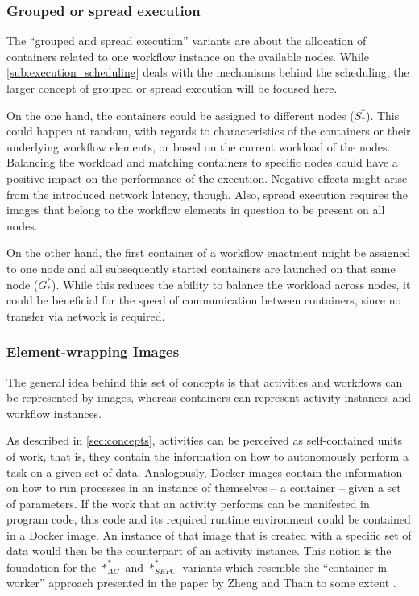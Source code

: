   \subsubsection{Grouped or spread execution} %
  \label{ssub:grouped_or_spread_execution}
    The ``grouped and spread execution'' variants are about the allocation of containers related to one workflow instance on the available nodes. While \ref{sub:execution_scheduling} deals with the mechanisms behind the scheduling, the larger concept of grouped or spread execution will be focused here.

    On the one hand, the containers could be assigned to different nodes ($S_*^*$). This could happen at random, with regards to characteristics of the containers or their underlying workflow elements, or based on the current workload of the nodes. Balancing the workload and matching containers to specific nodes could have a positive impact on the performance of the execution. Negative effects might arise from the introduced network latency, though. Also, spread execution requires the images that belong to the workflow elements in question to be present on all nodes.

    On the other hand, the first container of a workflow enactment might be assigned to one node and all subsequently started containers are launched on that same node ($G_*^*$). While this reduces the ability to balance the workload across nodes, it could be beneficial for the speed of communication between containers, since no transfer via network is required.

  \subsubsection{Element-wrapping Images} %
  \label{ssub:element_wrapping_containers}
    The general idea behind this set of concepts is that activities and workflows can be represented by images, whereas containers can represent activity instances and workflow instances.

    As described in \ref{sec:concepts}, activities can be perceived as self-contained units of work, that is, they contain the information on how to autonomously perform a task on a given set of data.
    Analogously, Docker images contain the information on how to run processes in an instance of themselves -- a container -- given a set of parameters. If the work that an activity performs can be manifested in  program code, this code and its required runtime environment could be contained in a Docker image. An instance of that image that is created with a specific set of data would then be the counterpart of an activity instance. This notion is the foundation for the $*_{AC}^{*}$ and $*_{SEPC}^{*}$ variants which resemble the ``container-in-worker'' approach presented in the paper by Zheng and Thain to some extent \cite{Zheng2015Integrating}.

